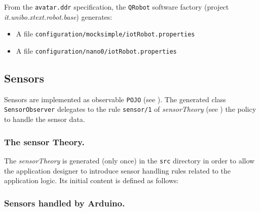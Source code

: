 From the \texttt{avatar.ddr} specification, the \texttt{QRobot} software factory (project \textit{it.unibo.xtext.robot.base}) generates:
\begin{itemize}
\item A file \texttt{configuration/mocksimple/iotRobot.properties} 


\item A file \texttt{configuration/nano0/iotRobot.properties} 


\end{itemize}

 
\subsection{Sensors}

Sensors are implemented as observable \texttt{POJO} (see ). The generated class \texttt{SensorObserver} delegates to the rule \texttt{sensor/1} of \textit{sensorTheory} (see ) the policy to handle the sensor data.



\subsubsection{The sensor Theory.}

The \textit{sensorTheory} is generated (only once) in the \texttt{src} directory in order to allow the application designer to introduce sensor handling rules related to the application logic. Its initial content is defined as follows:



\subsubsection{Sensors handled by Arduino.}

